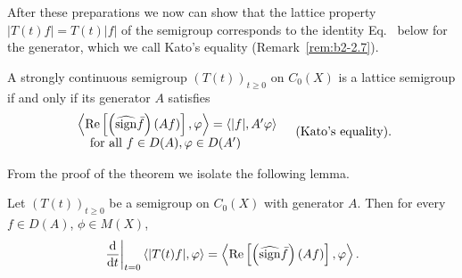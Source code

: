 After these preparations we now can show that the lattice property $|T(t)f| = T(t)|f|$ of the semigroup corresponds to the identity Eq.~ below for the generator, which we call Kato's equality (\cf Remark~\ref{rem:b2-2.7}).
\begin{theorem}\label{thm:b2-2.5}
A strongly continuous semigroup $(T(t))_{t \geq 0}$ on $C_{0}(X)$ is a lattice semigroup if and only if its generator $A$ satisfies
\begin{equation}\label{eq:b2-2.9}
\begin{array}{l}
\left\langle \Re\left[\left(\widehat{\sign} \bar{f}\right)(Af)\right],\phi \right\rangle = \langle |f|,A'\phi \rangle \\
\text{\quad for all } f \in D(A), \phi \in D(A') 
\end{array} \quad \text{(Kato's equality)}.
\end{equation}
\end{theorem}
From the proof of the theorem we isolate the following lemma.
\begin{lemma}\label{lem:b2-2.6}
Let $(T(t))_{t \geq 0}$ be a semigroup on $C_{0}(X)$ with generator $A$.
Then for every $f \in D(A)$, $\phi \in M(X)$,
\begin{equation}\label{eq:b2-2.10}
\left.\frac{\mathrm{d}}{\dt}
\right|_{t = 0} \langle |T(t)f|,\phi \rangle = \left\langle \Re\left[\left(\widehat{\sign} \bar{f}\right)(Af)\right],\phi \right\rangle.
\end{equation}
\end{lemma}
